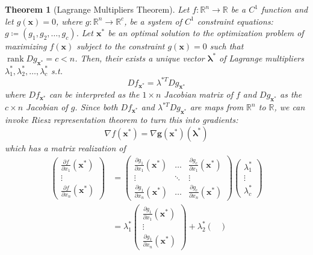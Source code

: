 \documentclass{article}
\DeclareMathOperator{\rank}{rank}
\newtheorem{theorem}{Theorem}[section]
\theoremstyle{remark}
\theoremstyle{definition}
\begin{document}
\begin{theorem}[Lagrange Multipliers Theorem]
Let $f: \mathbb{R}^n \longrightarrow \mathbb{R}$ be a $C^1$ function and let $g(\mathbf{x}) = 0$, where $g: \mathbb{R}^n \longrightarrow \mathbb{R}^c$, be a system of $C^1$ constraint equations: $g \coloneqq (g_1, g_2, \ldots, g_c)$. Let $\mathbf{x}^*$ be an optimal solution to the optimization problem of maximizing $f(\mathbf{x})$ subject to the constraint $g(\mathbf{x}) = 0$ such that $\rank D g_{\mathbf{x}^*} = c < n$. Then, their exists a unique vector $\boldsymbol{\lambda}^*$ of Lagrange multipliers $\lambda_1^*, \lambda_2^*, \ldots, \lambda_c^*$ s.t. 
\[D f_{\mathbf{x}^*} = \lambda^{*T} D g_{\mathbf{x}^*}\]
where $D f_{\mathbf{x}^*}$ can be interpreted as the $1 \times n$ Jacobian matrix of $f$ and $D g_{\mathbf{x}^*}$ as the $c \times n$ Jacobian of $g$. Since both $D f_{\mathbf{x}^*}$ and $\lambda^{*T} D g_{\mathbf{x}^*}$ are maps from $\mathbb{R}^n$ to $\mathbb{R}$, we can invoke Riesz representation theorem to turn this into gradients: 
\[\nabla f(\mathbf{x}^*) = \nabla \mathbf{g}(\mathbf{x}^*) (\boldsymbol{\lambda}^*)\]
which has a matrix realization of 
\begin{align*}
\begin{pmatrix}
\frac{\partial f}{\partial x_1} (\mathbf{x}^*) \\ \vdots\\ \frac{\partial f}{\partial x_n} (\mathbf{x}^*) \end{pmatrix} & = \begin{pmatrix}
\frac{\partial g_1}{\partial x_1} (\mathbf{x}^*)& \ldots & \frac{\partial g_c}{\partial x_1} (\mathbf{x}^*)\\
\vdots & \ddots & \vdots \\
\frac{\partial g_1}{\partial x_n} (\mathbf{x}^*)& \ldots & \frac{\partial g_c}{\partial x_n}(\mathbf{x}^*)
\end{pmatrix} \begin{pmatrix}
\lambda^*_1 \\ \vdots \\ \lambda^*_c \end{pmatrix} \\
& = \lambda^*_1 \begin{pmatrix}
\frac{\partial g_1}{\partial x_1} (\mathbf{x}^*) \\ \vdots \\ \frac{\partial g_1}{\partial x_n}(\mathbf{x}^*)
\end{pmatrix} + \lambda^*_2 \begin{pmatrix}

\end{pmatrix}
\end{align*}
\end{theorem}
\end{document}
